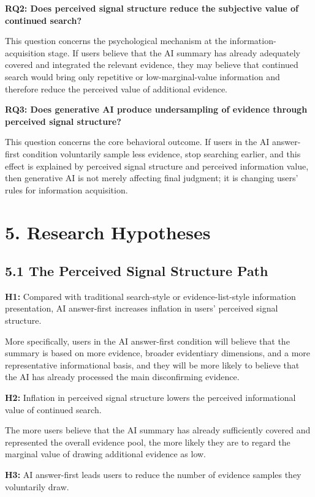 \textbf{RQ2: Does perceived signal structure reduce the subjective value of continued search?}

This question concerns the psychological mechanism at the information-acquisition stage. If users believe that the AI summary has already adequately covered and integrated the relevant evidence, they may believe that continued search would bring only repetitive or low-marginal-value information and therefore reduce the perceived value of additional evidence.

\textbf{RQ3: Does generative AI produce undersampling of evidence through perceived signal structure?}

This question concerns the core behavioral outcome. If users in the AI answer-first condition voluntarily sample less evidence, stop searching earlier, and this effect is explained by perceived signal structure and perceived information value, then generative AI is not merely affecting final judgment; it is changing users' rules for information acquisition.

\section*{5. Research Hypotheses}

\subsection*{5.1 The Perceived Signal Structure Path}

\textbf{H1:} Compared with traditional search-style or evidence-list-style information presentation, AI answer-first increases inflation in users' perceived signal structure.

More specifically, users in the AI answer-first condition will believe that the summary is based on more evidence, broader evidentiary dimensions, and a more representative informational basis, and they will be more likely to believe that the AI has already processed the main disconfirming evidence.

\textbf{H2:} Inflation in perceived signal structure lowers the perceived informational value of continued search.

The more users believe that the AI summary has already sufficiently covered and represented the overall evidence pool, the more likely they are to regard the marginal value of drawing additional evidence as low.

\textbf{H3:} AI answer-first leads users to reduce the number of evidence samples they voluntarily draw.

